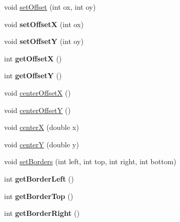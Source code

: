 \begin{DoxyCompactItemize}
\item 
void \hyperlink{classRS__GraphicView_a362433ecd461c38c07180adf364ecdcf}{set\-Offset} (int ox, int oy)
\item 
\hypertarget{classRS__GraphicView_a06af3523b59e5faf39bc5bb75a59d0bb}{void {\bfseries set\-Offset\-X} (int ox)}\label{classRS__GraphicView_a06af3523b59e5faf39bc5bb75a59d0bb}

\item 
\hypertarget{classRS__GraphicView_a40c4447acf325be91952c872b260d5e6}{void {\bfseries set\-Offset\-Y} (int oy)}\label{classRS__GraphicView_a40c4447acf325be91952c872b260d5e6}

\item 
\hypertarget{classRS__GraphicView_a06fb32648ec8d9dd05ba4292164767e9}{int {\bfseries get\-Offset\-X} ()}\label{classRS__GraphicView_a06fb32648ec8d9dd05ba4292164767e9}

\item 
\hypertarget{classRS__GraphicView_a8de371998ab49c3c537b1ffa342331c5}{int {\bfseries get\-Offset\-Y} ()}\label{classRS__GraphicView_a8de371998ab49c3c537b1ffa342331c5}

\item 
void \hyperlink{classRS__GraphicView_ab7f859e43fa6cab6cca99b1232669a5d}{center\-Offset\-X} ()
\item 
void \hyperlink{classRS__GraphicView_a1138774f79663135c2e09bfee42e4bcd}{center\-Offset\-Y} ()
\item 
void \hyperlink{classRS__GraphicView_a7c3865a1cd7540559dfa7159e1d44ab7}{center\-X} (double x)
\item 
void \hyperlink{classRS__GraphicView_a07d099a8f25687d9490c624d5e41037e}{center\-Y} (double y)
\item 
void \hyperlink{classRS__GraphicView_ae918f7b5fbfa52437fbe1a36adc0e37b}{set\-Borders} (int left, int top, int right, int bottom)
\item 
\hypertarget{classRS__GraphicView_aa8f379e89d05d0ee728916221ee75ee3}{int {\bfseries get\-Border\-Left} ()}\label{classRS__GraphicView_aa8f379e89d05d0ee728916221ee75ee3}

\item 
\hypertarget{classRS__GraphicView_ab7a80b615000f126eaa54c4c080c2aaf}{int {\bfseries get\-Border\-Top} ()}\label{classRS__GraphicView_ab7a80b615000f126eaa54c4c080c2aaf}

\item 
\hypertarget{classRS__GraphicView_ad150331c9cbd23a70b531061d9367595}{int {\bfseries get\-Border\-Right} ()}\label{classRS__GraphicView_ad150331c9cbd23a70b531061d9367595}


\end{DoxyCompactItemize}
